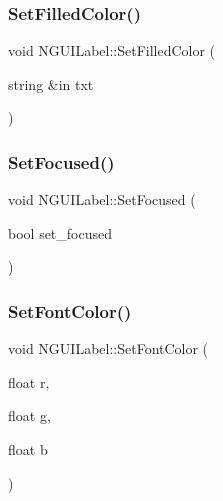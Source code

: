 \hypertarget{class_n_g_u_i_label_adf874f49e227d37f20dd81fb3ef82e8d}{}\label{class_n_g_u_i_label_adf874f49e227d37f20dd81fb3ef82e8d} 
\subsubsection{\texorpdfstring{Set\+Filled\+Color()}{SetFilledColor()}\hspace{0.1cm}{\footnotesize\ttfamily [2/2]}}
{\footnotesize\ttfamily void N\+G\+U\+I\+Label\+::\+Set\+Filled\+Color (\begin{DoxyParamCaption}\item[{string \&in}]{txt }\end{DoxyParamCaption})}

\hypertarget{class_n_g_u_i_label_a02267fdb7c60e6d155f2b73d037111ca}{}\label{class_n_g_u_i_label_a02267fdb7c60e6d155f2b73d037111ca} 
\subsubsection{\texorpdfstring{Set\+Focused()}{SetFocused()}}
{\footnotesize\ttfamily void N\+G\+U\+I\+Label\+::\+Set\+Focused (\begin{DoxyParamCaption}\item[{bool}]{set\+\_\+focused }\end{DoxyParamCaption})}

\hypertarget{class_n_g_u_i_label_a593f0ded110c86cc51f8c55604d35f8c}{}\label{class_n_g_u_i_label_a593f0ded110c86cc51f8c55604d35f8c} 
\subsubsection{\texorpdfstring{Set\+Font\+Color()}{SetFontColor()}}
{\footnotesize\ttfamily void N\+G\+U\+I\+Label\+::\+Set\+Font\+Color (\begin{DoxyParamCaption}\item[{float}]{r,  }\item[{float}]{g,  }\item[{float}]{b }\end{DoxyParamCaption})}

